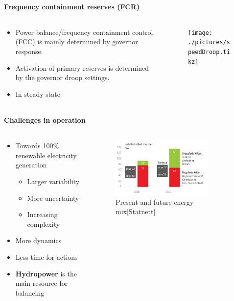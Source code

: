 \begin{frame}{\secname}
	\framesubtitle{Frequency containment reserves (FCR)}
	\begin{columns}
		\begin{column}{0.5\textwidth}
			\begin{itemize}
				\item<1-> Power balance/frequency containment control (FCC) is mainly determined by governor response.
				\item<1-> Activation of primary reserves is determined by the governor droop settings.
				\item<2-> In steady state
			\end{itemize}
		\end{column}
		\begin{column}{0.5\textwidth}	
			\begin{figure}
					\texttt{[image: ./pictures/speedDroop.tikz]}
			\end{figure}
		\end{column}
	\end{columns}
\end{frame}
\begin{frame}{\secname}
	\framesubtitle{Challenges in operation}
	\begin{columns}
		\begin{column}{0.5\textwidth}
		\begin{itemize}
			\item<1-> Towards 100\% renewable electricity generation
			\begin{itemize}
				\item Larger variability
				\item More uncertainty
				\item Increasing complexity
			\end{itemize}
			\item<2-> More dynamics
			\item<3-> Less time for actions
			\item<4-> \textbf{Hydropower} is the main resource for balancing
\end{itemize}
\end{column}
	\begin{column}{0.5\textwidth}
	\begin{figure}
	\includegraphics[width=0.8\textwidth]{./pictures/mix}
	\caption{Present and future energy mix[Statnett]}
	\end{figure}
	\end{column}
	\end{columns}
\end{frame}
